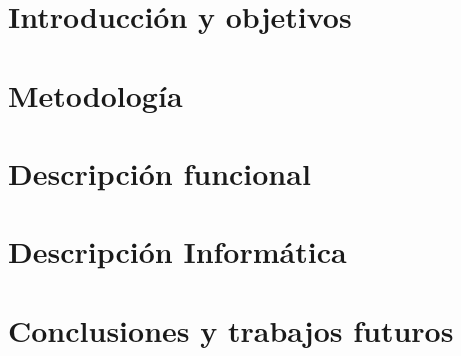 \documentclass[12pt,twoside,titlepage]{report}
\begin{document}

\pagestyle{fancy}


\setlength{\parskip}{0.75em}
\renewcommand{\baselinestretch}{1.25}
\cleardoublepage
{}
\setcounter{page}{1}


\chapter{Introducción y objetivos}



\blankpage

\chapter{Metodología}



\blankpage

\chapter{Descripción funcional}



\blankpage

\chapter{Descripción Informática}
\label{sec:descripcionInformatica}

\raggedbottom
\minitoc
\clearpage
\flushbottom



\blankpage


\chapter{Conclusiones y trabajos futuros}



\blankpage
\end{document}
